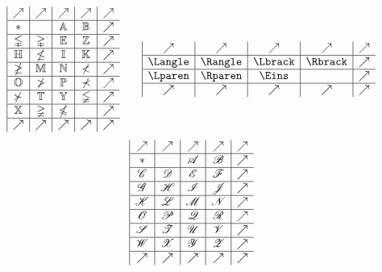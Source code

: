 \documentclass[11pt]{article}
\begin{document}
$$
\let\x\mathbb
\begin{array}{|c|c|c|c|c}
\nearrow&\nearrow&\nearrow&\nearrow&\nearrow\\\hline
*&&\x A&\x B&\nearrow\\\hline
\x \Gamma&\x \Delta&\x E&\x Z&\nearrow\\\hline
\x H&\x \Theta&\x I&\x K&\nearrow\\\hline
\x \Lambda&\x M&\x N&\x \Xi&\nearrow\\\hline
\x O&\x \Pi&\x P &\x \Sigma&\nearrow\\\hline
\x \Upsilon &\x T&\x Y &\x \Phi&\nearrow\\\hline
\x X &\x \Psi&\x \Omega & &\nearrow\\\hline
\nearrow&\nearrow&\nearrow&\nearrow&\nearrow
\end{array}
\qquad
\let\x\mathbb
\begin{array}{|c|c|c|c|c}
\nearrow&\nearrow&\nearrow&\nearrow&\nearrow\\\hline
\Langle &\Rangle &\Lbrack &\Rbrack &\nearrow\\\hline
\Lparen &\Rparen &\Eins & &\nearrow\\\hline
\nearrow&\nearrow&\nearrow&\nearrow&\nearrow
\end{array}
$$
$$
\let\x\mathscr
\begin{array}{|c|c|c|c|c}
\nearrow&\nearrow&\nearrow&\nearrow&\nearrow\\\hline
*&&\x A&\x B&\nearrow\\\hline
\x C&\x D&\x E&\x F&\nearrow\\\hline
\x G&\x H&\x I&\x J&\nearrow\\\hline
\x K&\x L&\x M&\x N&\nearrow\\\hline
\x O&\x P&\x Q&\x R&\nearrow\\\hline
\x S&\x T&\x U&\x V&\nearrow\\\hline
\x W&\x X&\x Y&\x Z&\nearrow\\\hline
\nearrow&\nearrow&\nearrow&\nearrow&\nearrow
\end{array}
$$
\end{document}
